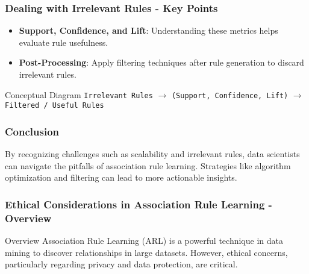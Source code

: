 \documentclass{beamer}
\begin{document}
\begin{frame}
    \frametitle{Dealing with Irrelevant Rules - Key Points}
    \begin{itemize}
        \item \textbf{Support, Confidence, and Lift}: Understanding these metrics helps evaluate rule usefulness.
        \item \textbf{Post-Processing}: Apply filtering techniques after rule generation to discard irrelevant rules.
    \end{itemize}
    \begin{block}{Conceptual Diagram}
        \centering
        \texttt{Irrelevant Rules} $\rightarrow$ \texttt{(Support, Confidence, Lift)} $\rightarrow$ \texttt{Filtered / Useful Rules}
    \end{block}
\end{frame}

\begin{frame}
    \frametitle{Conclusion}
    By recognizing challenges such as scalability and irrelevant rules, data scientists can navigate the pitfalls of association rule learning.
    Strategies like algorithm optimization and filtering can lead to more actionable insights.
\end{frame}

\begin{frame}[fragile]
    \frametitle{Ethical Considerations in Association Rule Learning - Overview}
    \begin{block}{Overview}
        Association Rule Learning (ARL) is a powerful technique in data mining to discover relationships in large datasets. However, ethical concerns, particularly regarding privacy and data protection, are critical.
    \end{block}
\end{frame}
\end{document}
